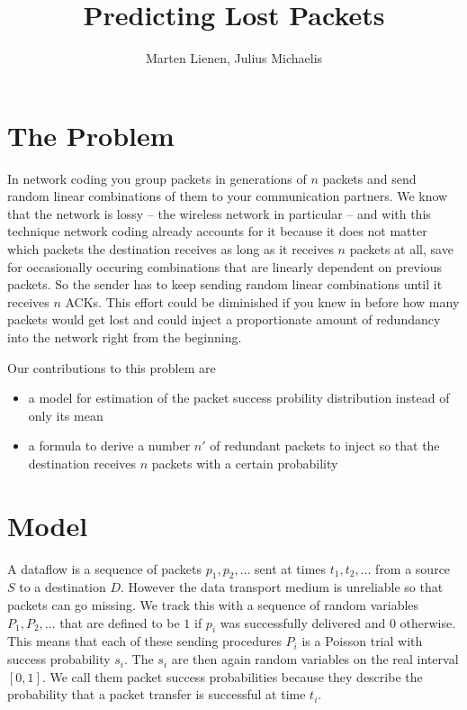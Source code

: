 \documentclass[10pt,a4paper]{article}
\title{Predicting Lost Packets}
\author{Marten Lienen, Julius Michaelis}
\begin{document}
\maketitle

\section{The Problem}

In network coding you group packets in generations of $n$ packets and send random linear combinations of them to your communication partners.
We know that the network is lossy -- the wireless network in particular -- and with this technique network coding already accounts for it because it does not matter which packets the destination receives as long as it receives $n$ packets at all, save for occasionally occuring combinations that are linearly dependent on previous packets.
So the sender has to keep sending random linear combinations until it receives $n$ ACKs.
This effort could be diminished if you knew in before how many packets would get lost and could inject a proportionate amount of redundancy into the network right from the beginning.

Our contributions to this problem are
\begin{itemize}
\item a model for estimation of the packet success probility distribution instead of only its mean
\item a formula to derive a number $n'$ of redundant packets to inject so that the destination receives $n$ packets with a certain probability
\end{itemize}

\section{Model}

A dataflow is a sequence of packets $p_{1}, p_{2}, \dots$ sent at times $t_{1}, t_{2}, \dots$ from a source $S$ to a destination $D$.
However the data transport medium is unreliable so that packets can go missing.
We track this with a sequence of random variables $P_{1}, P_{2}, \dots$ that are defined to be $1$ if $p_{i}$ was successfully delivered and $0$ otherwise.
This means that each of these sending procedures $P_{i}$ is a Poisson trial with success probability $s_{i}$.
The $s_{i}$ are then again random variables on the real interval $[0, 1]$.
We call them packet success probabilities because they describe the probability that a packet transfer is successful at time $t_{i}$.
\end{document}
